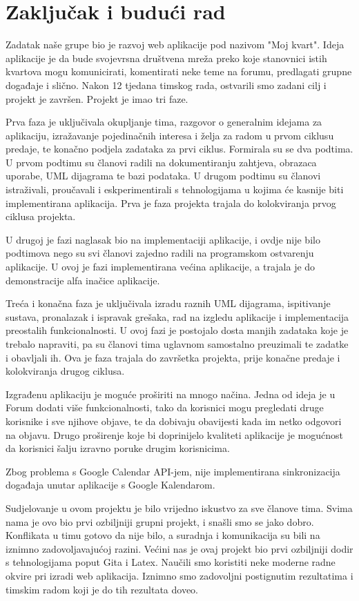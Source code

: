\chapter{Zaključak i budući rad}
		
		Zadatak naše grupe bio je razvoj web aplikacije pod nazivom "Moj kvart". Ideja aplikacije je da bude svojevrsna društvena mreža preko koje stanovnici istih kvartova mogu komunicirati, komentirati neke teme na forumu, predlagati grupne događaje i slično. Nakon 12 tjedana timskog rada, ostvarili smo zadani cilj i projekt je završen. Projekt je imao tri faze.
		
		Prva faza je uključivala okupljanje tima, razgovor o generalnim idejama za aplikaciju, izražavanje pojedinačnih interesa i želja za radom u prvom ciklusu predaje, te konačno podjela zadataka za prvi ciklus. Formirala su se dva podtima. U prvom podtimu su članovi radili na dokumentiranju zahtjeva, obrazaca uporabe, UML dijagrama te bazi podataka. U drugom podtimu su članovi istraživali, proučavali i eskperimentirali s tehnologijama u kojima će kasnije biti implementirana aplikacija. Prva je faza projekta trajala do kolokviranja prvog ciklusa projekta.
		
		U drugoj je fazi naglasak bio na implementaciji aplikacije, i ovdje nije bilo podtimova nego su svi članovi zajedno radili na programskom ostvarenju aplikacije. U ovoj je fazi implementirana većina aplikacije, a trajala je do demonstracije alfa inačice aplikacije.
		
		Treća i konačna faza je uključivala izradu raznih UML dijagrama, ispitivanje sustava, pronalazak i ispravak grešaka, rad na izgledu aplikacije i implementacija preostalih funkcionalnosti. U ovoj fazi je postojalo dosta manjih zadataka koje je trebalo napraviti, pa su članovi tima uglavnom samostalno preuzimali te zadatke i obavljali ih. Ova je faza trajala do završetka projekta, prije konačne predaje i kolokviranja drugog ciklusa.
		
		Izgrađenu aplikaciju je moguće proširiti na mnogo načina. Jedna od ideja je u Forum dodati više funkcionalnosti, tako da korisnici mogu pregledati druge korisnike i sve njihove objave, te da dobivaju obavijesti kada im netko odgovori na objavu. Drugo proširenje koje bi doprinijelo kvaliteti aplikacije je mogućnost da korisnici šalju izravno poruke drugim korisnicima.
		
		Zbog problema s Google Calendar API-jem, nije implementirana sinkronizacija događaja unutar aplikacije s Google Kalendarom.
		
		Sudjelovanje u ovom projektu je bilo vrijedno iskustvo za sve članove tima. Svima nama je ovo bio prvi ozbiljniji grupni projekt, i snašli smo se jako dobro. Konflikata u timu gotovo da nije bilo, a suradnja i komunikacija su bili na iznimno zadovoljavajućoj razini. Većini nas je ovaj projekt bio prvi ozbiljniji dodir s tehnologijama poput Gita i Latex. Naučili smo koristiti neke moderne radne okvire pri izradi web aplikacija. Iznimno smo zadovoljni postignutim rezultatima i timskim radom koji je do tih rezultata doveo.
		
		\eject 